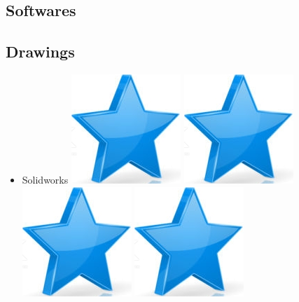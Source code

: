 \documentclass[10pt,a4paper,sans]{article}
\begin{document}
\begin{minipage}[t]{0.28\textwidth}
    \begin{mdframed}[style=cadreCompetences]
        \section{Softwares}
        \subsection{Drawings}
        \begin{itemize}
            \item{Solidworks
                    \hfill
                    \includegraphics[scale=0.25]{img/star.png} \hspace{-0.22cm}
                    \includegraphics[scale=0.25]{img/star.png} \hspace{-0.22cm}
                    \includegraphics[scale=0.25]{img/star.png} \hspace{-0.22cm}
                    \includegraphics[scale=0.25]{img/star.png} \hspace{-0.22cm}
}
\end{itemize}
\end{mdframed}
\end{minipage}
\end{document}
